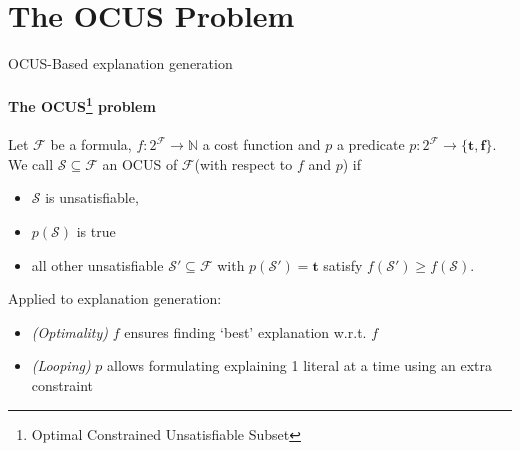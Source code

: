 \documentclass{beamer}
\newcommand\m[1]{\ensuremath{\mathcal{#1}}\xspace}
\newcommand\formula{\ensuremath{\m{F} }\xspace}
\renewcommand\emph[1]{{\color{vuborange}#1}}
\newcommand\nat{\m{\mathbb{N}}}
\newcommand\subsetT{\m{\mathcal{S}}}
\newcommand\ltrue{\m{\textbf{t}}}
\newcommand\lfalse{\m{\textbf{f}}}
\begin{document}
\section{The OCUS Problem}

\begin{frame}
\tableofcontents[currentsection]
\end{frame}			

\begin{frame}{OCUS-Based explanation generation}
\framesubtitle{The OCUS\footnote{Optimal \emph{Constrained} Unsatisfiable Subset} problem}
\begin{definition}
	\small
	Let $\formula$ be a formula, $f:2^{\formula} \to \nat$ a cost function and  $p$ a predicate $p: 2^{\formula}\to \{\ltrue,\lfalse\}$. We call %
		$\subsetT \subseteq \formula$ an \emph{OCUS}  of \formula (with respect to $f$ and $p$) if \begin{itemize}                                      
			\item $\subsetT$ is unsatisfiable,
			\item $p(\subsetT)$ is true
			\item \emph{all other unsatisfiable $\subsetT'\subseteq \formula$ with $p(\subsetT')=\ltrue$ satisfy $f(\subsetT')\geq f(\subsetT)$}.
		\end{itemize}
	\end{definition} \pause
	
	\vfill
	Applied to explanation generation: \pause
	\begin{itemize}
		\item[Q1] \textit{\emph{(Optimality)}} {\color{red}$f$} ensures finding `best' explanation w.r.t. $f$\pause
		\item[Q2] \textit{\emph{(Looping)}} {\color{red}$p$} allows formulating explaining 1 literal at a time using an extra constraint
	\end{itemize}
	
\end{frame}		
\end{document}
